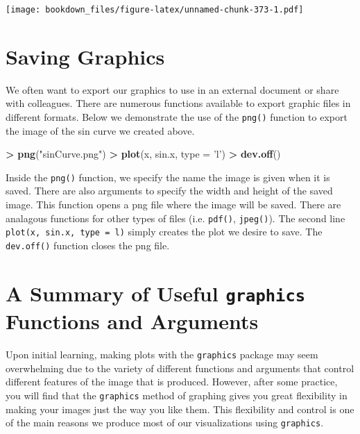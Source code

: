\documentclass[]{krantz}
\makeatletter
\newenvironment{Shaded}{\begin{snugshade}}{\end{snugshade}}
\newcommand{\KeywordTok}[1]{\textcolor[rgb]{0.27,0.27,0.27}{\textbf{#1}}}
\newcommand{\DataTypeTok}[1]{\textcolor[rgb]{0.27,0.27,0.27}{#1}}
\newcommand{\StringTok}[1]{\textcolor[rgb]{0.5,0.5,0.5}{#1}}
\newcommand{\OperatorTok}[1]{\textcolor[rgb]{0.43,0.43,0.43}{\textbf{#1}}}
\newcommand{\NormalTok}[1]{#1}
\newenvironment{kframe}{%
\medskip{}
\setlength{\fboxsep}{.8em}
 \def\at@end@of@kframe{}%
 \ifinner\ifhmode%
  \def\at@end@of@kframe{\end{minipage}}%
  \begin{minipage}{\columnwidth}%
 \fi\fi%
 \def\FrameCommand##1{\hskip\@totalleftmargin \hskip-\fboxsep
 \colorbox{shadecolor}{##1}\hskip-\fboxsep
     \hskip-\linewidth \hskip-\@totalleftmargin \hskip\columnwidth}%
 \MakeFramed {\advance\hsize-\width
   \@totalleftmargin\z@ \linewidth\hsize
   \@setminipage}}%
 {\par\unskip\endMakeFramed%
 \at@end@of@kframe}
\renewenvironment{Shaded}{\begin{kframe}}{\end{kframe}}
\makeatother
\begin{document}
\texttt{[image: bookdown\_files/figure-latex/unnamed-chunk-373-1.pdf]}

\section{Saving Graphics}\label{saving-graphics-1}

We often want to export our graphics to use in an external document or
share with colleagues. There are numerous functions available to export
graphic files in different formats. Below we demonstrate the use of the
\texttt{png()} function to export the image of the sin curve we created
above.

\begin{Shaded}
\begin{Highlighting}[]
\OperatorTok{>}\StringTok{ }\KeywordTok{png}\NormalTok{(}\StringTok{"sinCurve.png"}\NormalTok{)}
\OperatorTok{>}\StringTok{ }\KeywordTok{plot}\NormalTok{(x, sin.x, }\DataTypeTok{type =} \StringTok{'l'}\NormalTok{)}
\OperatorTok{>}\StringTok{ }\KeywordTok{dev.off}\NormalTok{()}
\end{Highlighting}
\end{Shaded}

Inside the \texttt{png()} function, we specify the name the image is
given when it is saved. There are also arguments to specify the width
and height of the saved image. This function opens a png file where the
image will be saved. There are analagous functions for other types of
files (i.e. \texttt{pdf()}, \texttt{jpeg()}). The second line
\texttt{plot(x,\ sin.x,\ type\ =\ \textquotesingle{}l\textquotesingle{})}
simply creates the plot we desire to save. The \texttt{dev.off()}
function closes the png file.

\section{\texorpdfstring{A Summary of Useful \texttt{graphics} Functions
and
Arguments}{A Summary of Useful graphics Functions and Arguments}}\label{a-summary-of-useful-graphics-functions-and-arguments}

Upon initial learning, making plots with the \texttt{graphics} package
may seem overwhelming due to the variety of different functions and
arguments that control different features of the image that is produced.
However, after some practice, you will find that the \texttt{graphics}
method of graphing gives you great flexibility in making your images
just the way you like them. This flexibility and control is one of the
main reasons we produce most of our visualizations using
\texttt{graphics}.
\end{document}
